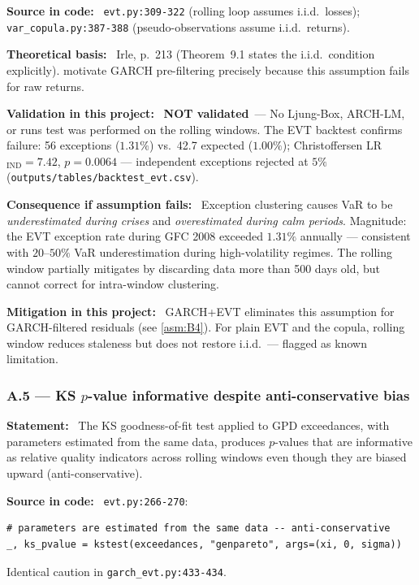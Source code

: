 \documentclass[11pt,a4paper]{article}
\newcommand{\asmfield}[1]{\medskip\noindent\textbf{#1:}\ }
\newcommand{\code}[1]{\texttt{#1}}
\newcommand{\notvalidated}{\textbf{NOT validated}}
\begin{document}
\asmfield{Source in code}
\code{evt.py:309-322} (rolling loop assumes i.i.d.\ losses);
\code{var\_copula.py:387-388} (pseudo-observations assume i.i.d.\ returns).

\asmfield{Theoretical basis}
Irle, p.~213 (Theorem~9.1 states the i.i.d.\ condition explicitly).
\cite{McNeilFrey2000} motivate GARCH pre-filtering precisely because this
assumption fails for raw returns.

\asmfield{Validation in this project}
\notvalidated\ --- No Ljung-Box, ARCH-LM, or runs test was performed on
the rolling windows. The EVT backtest confirms failure: 56 exceptions
($1.31\%$) vs.\ 42.7 expected ($1.00\%$); Christoffersen LR$_{\mathrm{IND}}
= 7.42$, $p = 0.0064$ --- independent exceptions rejected at $5\%$
(\code{outputs/tables/backtest\_evt.csv}).

\asmfield{Consequence if assumption fails}
Exception clustering causes VaR to be \emph{underestimated during crises}
and \emph{overestimated during calm periods}. Magnitude: the EVT exception
rate during GFC 2008 exceeded $1.31\%$ annually --- consistent with
$20$--$50\%$ VaR underestimation during high-volatility regimes. The
rolling window partially mitigates by discarding data more than 500 days
old, but cannot correct for intra-window clustering.

\asmfield{Mitigation in this project}
GARCH+EVT eliminates this assumption for GARCH-filtered residuals (see
\cref{asm:B4}). For plain EVT and the copula, rolling window reduces
staleness but does not restore i.i.d.\ --- flagged as known limitation.

\subsubsection{A.5 --- KS $p$-value informative despite anti-conservative bias}\label{asm:A5}

\asmfield{Statement}
The KS goodness-of-fit test applied to GPD exceedances, with parameters
estimated from the same data, produces $p$-values that are informative as
relative quality indicators across rolling windows even though they are
biased upward (anti-conservative).

\asmfield{Source in code}
\code{evt.py:266-270}:
\begin{lstlisting}
# parameters are estimated from the same data -- anti-conservative
_, ks_pvalue = kstest(exceedances, "genpareto", args=(xi, 0, sigma))
\end{lstlisting}
Identical caution in \code{garch\_evt.py:433-434}.
\end{document}
